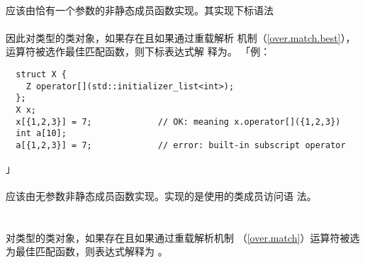 \paragraph{}
应该由恰有一个参数的非静态成员函数实现。其实现下标语法         \\
\mbox{}                                                                   \\
因此对类型的类对象，如果存在且如果通过重载解析
机制（\ref{over.match.best}），运算符被选作最佳匹配函数，则下标表达式解
释为。 「例：
\begin{lstlisting}
  struct X {
    Z operator[](std::initializer_list<int>);
  };
  X x;
  x[{1,2,3}] = 7;             // OK: meaning x.operator[]({1,2,3})
  int a[10];
  a[{1,2,3}] = 7;             // error: built-in subscript operator
\end{lstlisting}」

\paragraph{}
应该由无参数非静态成员函数实现。实现的是使用\tm{->}的类成员访问语
法。                                                                          \\
\mbox{}                                                          \\
\mbox{}    \\
对类型的类对象，如果存在且如果通过重载解析机制
（\ref{over.match}）运算符被选为最佳匹配函数，则表达式解释为
。

